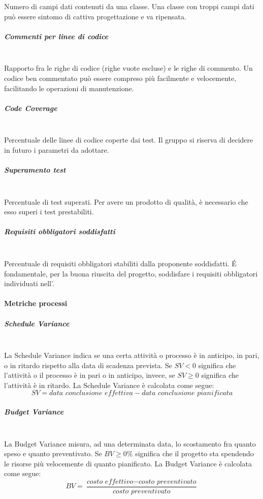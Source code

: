 Numero di campi dati contenuti da una classe. Una classe con troppi campi dati può essere sintomo di cattiva progettazione e va ripensata.
\subparagraph{Commenti per linee di codice}\mbox{}\\
Rapporto fra le righe di codice (righe vuote escluse) e le righe di commento. Un codice ben commentato può essere compreso più facilmente e velocemente, facilitando le operazioni di manutenzione.
\subparagraph{Code Coverage}\mbox{}\\
Percentuale delle linee di codice coperte dai test.
Il gruppo \gruppo \space si riserva di decidere in futuro i parametri da adottare.
\subparagraph{Superamento test}\mbox{}\\
Percentuale di test superati. Per avere un prodotto di qualità, è necessario che esso superi i test prestabiliti.
\subparagraph{Requisiti obbligatori soddisfatti}\mbox{}\\
Percentuale di requisiti obbligatori stabiliti dalla proponente soddisfatti. \'E fondamentale, per la buona riuscita del progetto, soddisfare i requisiti obbligatori individuati nell'\AdR .
	
\paragraph{Metriche processi}\mbox{}
\subparagraph{Schedule Variance}\mbox{}\\
La Schedule Variance indica se una certa attività o processo è in anticipo, in pari, o in ritardo rispetto alla data di scadenza prevista.
Se $SV < 0$ significa che l'attività o il processo è in pari o in anticipo, invece, se $SV \geq 0$ significa che l'attività è in ritardo.
La Schedule Variance è calcolata come segue:
\[
SV = \textit{data conclusione effettiva} - \textit{data conclusione pianificata}
\]
\subparagraph{Budget Variance}\mbox{}\\
La Budget Variance misura, ad una determinata data, lo scostamento fra quanto speso e quanto preventivato. Se $BV \geq 0\%$ significa che il progetto sta spendendo le risorse più velocemente di quanto pianificato.
La Budget Variance è calcolata come segue:
\[
BV = \frac{\textit{costo effettivo} - \textit{costo preventivato}}{\textit{costo preventivato}}
\]

